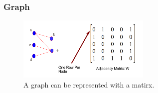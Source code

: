 \documentclass[notheorems,mathserif,table,compress]{beamer}  %
\begin{document}

\begin{frame}
\frametitle{Graph}
    \begin{figure}[!ht]
     \centering
     \includegraphics[width=2.5in]{graph_matrix.png} \\
      A graph can be represented with a matirx.
     \end{figure}
\end{frame}
\end{document}
